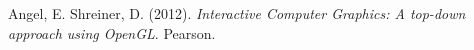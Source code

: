 \begin{thebibliography}{9}
Angel, E. Shreiner, D. (2012). \emph{Interactive Computer Graphics: A top-down approach using OpenGL}. Pearson. 
\end{thebibliography}